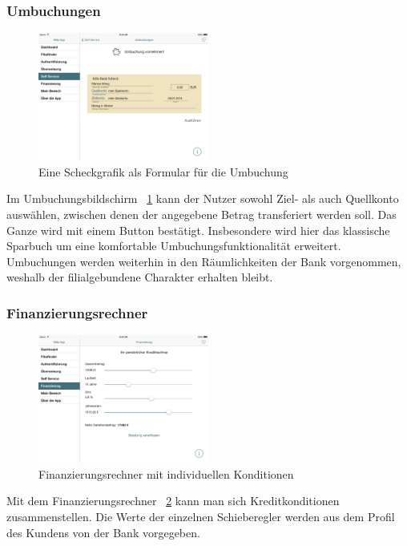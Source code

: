 \subsubsection{Umbuchungen}
\begin{figure}[h!]
	\centering
  \includegraphics[width=0.5\textwidth]{Pictures/umbuchung}
	\caption{Eine Scheckgrafik als Formular für die Umbuchung}
	\label{fig8}
\end{figure}

	Im Umbuchungsbildschirm ~\ref{fig8} kann der Nutzer sowohl Ziel- als auch Quellkonto auswählen, zwischen denen der angegebene Betrag transferiert werden soll. Das Ganze wird mit einem Button bestätigt. Insbesondere wird hier das klassische Sparbuch um eine komfortable Umbuchungsfunktionalität erweitert. Umbuchungen werden weiterhin in den Räumlichkeiten der Bank vorgenommen, weshalb der filialgebundene Charakter erhalten bleibt.
\subsubsection{Finanzierungsrechner}
\begin{figure}[h!]
	\centering
  \includegraphics[width=0.5\textwidth]{Pictures/finanzierung}
	\caption{Finanzierungsrechner mit individuellen Konditionen}
	\label{fig9}
\end{figure}

	Mit dem Finanzierungsrechner ~\ref{fig9} kann man sich Kreditkonditionen zusammenstellen. Die Werte der einzelnen Schieberegler werden aus dem Profil des Kundens von der Bank vorgegeben.

